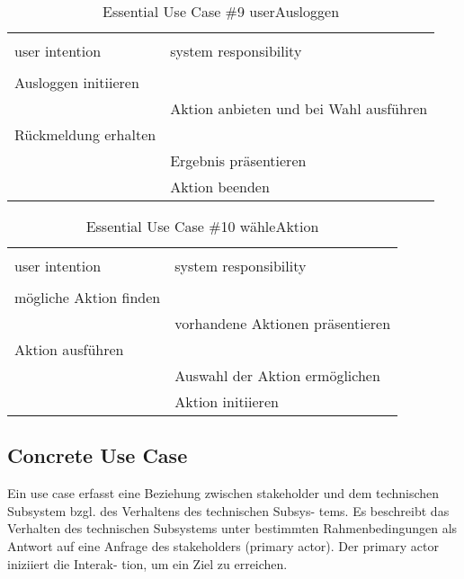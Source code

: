 \begin{table}[H]
\caption{Essential Use Case \#9 userAusloggen }
\centering
\begin{tabular}{l l}
\\ [-0.5ex]

\hline\hline
\\ [-0.5ex]
user intention & system responsibility
\\ [1.5ex]
\hline
\\ [-0.5ex]
Ausloggen initiieren		& 											 \\[1ex]
							& Aktion anbieten und bei Wahl ausführen	 \\[1ex]
Rückmeldung erhalten		&	     									 \\[1ex]
							& Ergebnis präsentieren			    		 \\[1ex]
							& Aktion beenden					    	 \\[1ex]

\hline
\end{tabular}
\label{tab:ausloggen}
\end{table}

\begin{table}[H]
\caption{Essential Use Case \#10 wähleAktion }
\centering
\begin{tabular}{l l}
\\ [-0.5ex]

\hline\hline
\\ [-0.5ex]
user intention & system responsibility
\\ [1.5ex]
\hline
\\ [-0.5ex]
mögliche Aktion finden			& 											\\[1ex]
								& vorhandene Aktionen präsentieren			\\[1ex]
Aktion ausführen 				& 											\\[1ex] 
								& Auswahl der Aktion ermöglichen			\\[1ex]
								& Aktion initiieren							\\[1ex]
\hline
\end{tabular}
\label{tab:aktionen}
\end{table}

\newpage
\subsection{Concrete Use Case}
Ein use case erfasst eine Beziehung zwischen stakeholder und dem technischen Subsystem bzgl. des Verhaltens des technischen Subsys- tems. Es beschreibt das Verhalten des technischen Subsystems unter bestimmten Rahmenbedingungen als Antwort auf eine Anfrage des stakeholders (primary actor). Der primary actor iniziiert die Interak- tion, um ein Ziel zu erreichen.

